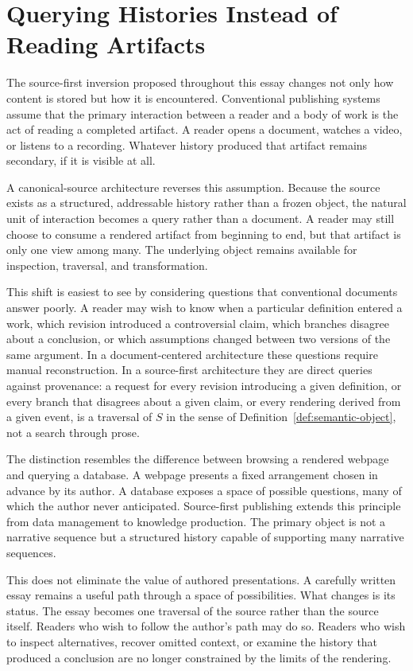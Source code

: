 \documentclass[11pt]{article}
\theoremstyle{definition}
\begin{document}
\section{Querying Histories Instead of Reading Artifacts}
\label{sec:querying}

The source-first inversion proposed throughout this essay changes not only how content is stored but how it is encountered. Conventional publishing systems assume that the primary interaction between a reader and a body of work is the act of reading a completed artifact. A reader opens a document, watches a video, or listens to a recording. Whatever history produced that artifact remains secondary, if it is visible at all.

A canonical-source architecture reverses this assumption. Because the source exists as a structured, addressable history rather than a frozen object, the natural unit of interaction becomes a query rather than a document. A reader may still choose to consume a rendered artifact from beginning to end, but that artifact is only one view among many. The underlying object remains available for inspection, traversal, and transformation.

This shift is easiest to see by considering questions that conventional documents answer poorly. A reader may wish to know when a particular definition entered a work, which revision introduced a controversial claim, which branches disagree about a conclusion, or which assumptions changed between two versions of the same argument. In a document-centered architecture these questions require manual reconstruction. In a source-first architecture they are direct queries against provenance: a request for every revision introducing a given definition, or every branch that disagrees about a given claim, or every rendering derived from a given event, is a traversal of $S$ in the sense of Definition~\ref{def:semantic-object}, not a search through prose.

The distinction resembles the difference between browsing a rendered webpage and querying a database. A webpage presents a fixed arrangement chosen in advance by its author. A database exposes a space of possible questions, many of which the author never anticipated. Source-first publishing extends this principle from data management to knowledge production. The primary object is not a narrative sequence but a structured history capable of supporting many narrative sequences.

This does not eliminate the value of authored presentations. A carefully written essay remains a useful path through a space of possibilities. What changes is its status. The essay becomes one traversal of the source rather than the source itself. Readers who wish to follow the author's path may do so. Readers who wish to inspect alternatives, recover omitted context, or examine the history that produced a conclusion are no longer constrained by the limits of the rendering.
\end{document}
